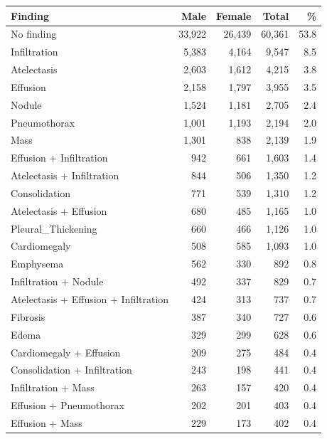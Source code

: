 \documentclass{article}
\begin{document}
\begin{singlespace}
\small{
\begin{longtable}{lrrrr}
Finding & Male & Female & Total & \% \\
\midrule
No finding              & 33,922 & 26,439 & 60,361 & 53.8   \\
Infiltration            & 5,383  & 4,164  & 9,547  & 8.5    \\
Atelectasis             & 2,603  & 1,612  & 4,215  & 3.8    \\
Effusion                & 2,158  & 1,797  & 3,955  & 3.5    \\ \midrule[0.1pt]
Nodule                  & 1,524  & 1,181  & 2,705  & 2.4    \\
Pneumothorax            & 1,001  & 1,193  & 2,194  & 2.0    \\
Mass                    & 1,301  & 838   & 2,139  & 1.9    \\
Effusion + Infiltration   & 942   & 661   & 1,603  & 1.4    \\ \midrule[0.1pt]
Atelectasis + Infiltration & 844   & 506   & 1,350  & 1.2    \\
Consolidation           & 771   & 539   & 1,310  & 1.2    \\
Atelectasis + Effusion    & 680   & 485   & 1,165  & 1.0    \\
Pleural\_Thickening     & 660   & 466   & 1,126  & 1.0    \\ \midrule[0.1pt]
Cardiomegaly            & 508   & 585   & 1,093  & 1.0    \\
Emphysema               & 562   & 330   & 892   & 0.8    \\
Infiltration + Nodule     & 492   & 337   & 829   & 0.7    \\
Atelectasis + Effusion + Infiltration     & 424   & 313   & 737   & 0.7    \\ \midrule[0.1pt]
Fibrosis                & 387   & 340   & 727   & 0.6    \\
Edema                   & 329     & 299   & 628   & 0.6    \\
Cardiomegaly + Effusion   & 209   & 275   & 484   & 0.4    \\
Consolidation + Infiltration            & 243   & 198   & 441   & 0.4    \\ \midrule[0.1pt]
Infiltration + Mass       & 263   & 157   & 420   & 0.4    \\
Effusion + Pneumothorax   & 202   & 201   & 403   & 0.4    \\
Effusion + Mass           & 229   & 173   & 402   & 0.4    \\

\end{longtable}}
\end{singlespace}
\end{document}
